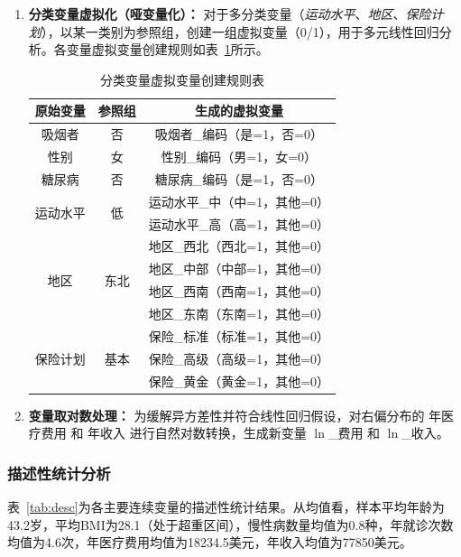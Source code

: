 \documentclass[a4paper]{ctexart}
\begin{document}
\begin{enumerate}[(1)]
\item \textbf{分类变量虚拟化（哑变量化）：}
对于多分类变量（\textit{运动水平}、\textit{地区}、\textit{保险计划}），以某一类别为参照组，创建一组虚拟变量（0/1），用于多元线性回归分析。各变量虚拟变量创建规则如表~\ref{tab:dummy}所示。

\begin{table}[H]
\centering
\caption{分类变量虚拟变量创建规则表}
\label{tab:dummy}
\begin{tabular}{c c c}
\toprule
原始变量 & 参照组 & 生成的虚拟变量 \\
\midrule
吸烟者 & 否 & 吸烟者\_编码（是=1，否=0） \\
性别 & 女 & 性别\_编码（男=1，女=0） \\
糖尿病 & 否 & 糖尿病\_编码（是=1，否=0） \\
\midrule
\multirow{2}{*}{运动水平} & \multirow{2}{*}{低} & 运动水平\_中（中=1，其他=0） \\
& & 运动水平\_高（高=1，其他=0） \\
\midrule
\multirow{4}{*}{地区} & \multirow{4}{*}{东北} & 地区\_西北（西北=1，其他=0） \\
& & 地区\_中部（中部=1，其他=0） \\
& & 地区\_西南（西南=1，其他=0） \\
& & 地区\_东南（东南=1，其他=0） \\
\midrule
\multirow{3}{*}{保险计划} & \multirow{3}{*}{基本} & 保险\_标准（标准=1，其他=0） \\
& & 保险\_高级（高级=1，其他=0） \\
& & 保险\_黄金（黄金=1，其他=0） \\
\bottomrule
\end{tabular}
\end{table}

\item \textbf{变量取对数处理：}
为缓解异方差性并符合线性回归假设，对右偏分布的 年医疗费用 和 年收入 进行自然对数转换，生成新变量 $\ln$\_费用 和 $\ln$\_收入。
\end{enumerate}


\subsubsection{描述性统计分析}

表~\ref{tab:desc}为各主要连续变量的描述性统计结果。从均值看，样本平均年龄为43.2岁，平均BMI为28.1（处于超重区间），慢性病数量均值为0.8种，年就诊次数均值为4.6次，年医疗费用均值为18234.5美元，年收入均值为77850美元。
\end{document}
